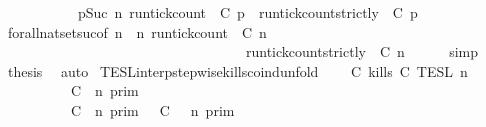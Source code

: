 \begin{isabellebody}
\ \ \ \ \ \ \ \ \ {\isasyminter}\ {\isacharbraceleft}{\isasymrho}{\isachardot}\ {\isasymforall}p{\isasymge}Suc\ n{\isachardot}\ {\isacharparenleft}run{\isacharunderscore}tick{\isacharunderscore}count\ {\isasymrho}\ C\ p{\isacharparenright}\ {\isasymle}\ {\isacharparenleft}run{\isacharunderscore}tick{\isacharunderscore}count{\isacharunderscore}strictly\ {\isasymrho}\ C\ p{\isacharparenright}{\isacharbraceright}{\isacartoucheclose}\isanewline
\ \ \ \ \isamarkupfalse%
\ forall{\isacharunderscore}nat{\isacharunderscore}set{\isacharunderscore}suc{\isacharbrackleft}of\ {\isacartoucheopen}n{\isacartoucheclose}\ {\isacartoucheopen}{\isasymlambda}{\isasymrho}\ n{\isachardot}\ {\isacharparenleft}run{\isacharunderscore}tick{\isacharunderscore}count\ {\isasymrho}\ C\ n{\isacharparenright}\isanewline
\ \ \ \ \ \ \ \ \ \ \ \ \ \ \ \ \ \ \ \ \ \ \ \ \ \ \ \ \ \ \ \ \ \ {\isasymle}\ {\isacharparenleft}run{\isacharunderscore}tick{\isacharunderscore}count{\isacharunderscore}strictly\ {\isasymrho}\ C\ n{\isacharparenright}{\isacartoucheclose}{\isacharbrackright}\isanewline
\ \ \ \ \isamarkupfalse%
\ simp\isanewline
\ \ \isamarkupfalse%
\ {\isacharquery}thesis\ \isamarkupfalse%
\ auto\isanewline
{}\isamarkupfalse%
%
\endisatagproof
{\isafoldproof}%
%
\isadelimproof
\isanewline
%
\endisadelimproof
\isanewline
{}\isamarkupfalse%
\ TESL{\isacharunderscore}interp{\isacharunderscore}stepwise{\isacharunderscore}kills{\isacharunderscore}coind{\isacharunderscore}unfold{\isacharcolon}\isanewline
\ \ \ {\isacartoucheopen}{\isasymlbrakk}\ C\ kills\ C\ {\isasymrbrakk}\isactrlsub T\isactrlsub E\isactrlsub S\isactrlsub L\isactrlbsup {\isasymge}\ n\isactrlesup \ {\isacharequal}\isanewline
\ \ \ \ \ \ {\isacharparenleft}\ \ \ {\isasymlbrakk}\ C\ {\isasymnot}{\isasymUp}\ n\ {\isasymrbrakk}\isactrlsub p\isactrlsub r\isactrlsub i\isactrlsub m\ \ \ \ \ \ \ \ \ \ \ \ \ \ \ \ \ \ \ \ \ \ \ \ %
\isanewline
\ \ \ \ \ \ \ \ {\isasymunion}\ {\isasymlbrakk}\ C\ {\isasymUp}\ n\ {\isasymrbrakk}\isactrlsub p\isactrlsub r\isactrlsub i\isactrlsub m\ {\isasyminter}\ {\isasymlbrakk}\ C\ {\isasymnot}{\isasymUp}\ {\isasymge}\ n\ {\isasymrbrakk}\isactrlsub p\isactrlsub r\isactrlsub i\isactrlsub m{\isacharparenright}\ \ \ \ %

\end{isabellebody}
